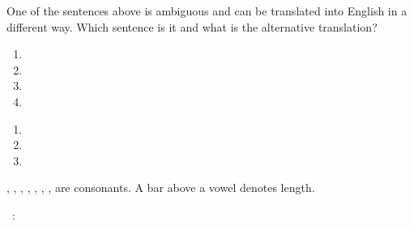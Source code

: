\begin{refsection}
\begin{problem}{\langnameArabic}{\nameGDurnovo}{}
\begin{assgts}
\item One of the sentences above is ambiguous and can be translated into English in a different way. Which sentence is it and what is the alternative translation?
\item \transinen
\begin{enumerate}[start = 6]
    \item {}
    \item {}
    \item {}
    \item {}
\end{enumerate}
\item \transinen[\langnameArabic]
\begin{enumerate}[resume]
    \item {}
    \item {}
    \item {}
\end{enumerate}
\end{assgts}

\begin{tblsWarning}
, , , , , , ,  are consonants. A bar above a vowel denotes length.
\end{tblsWarning}
\end{problem}

\begin{problem}{\langnameWelsh}{\nameTMaisak}{}
\IntroSentences{\langnameWelsh}\ \IntroAndEnglish:


\end{problem}
\end{refsection}
